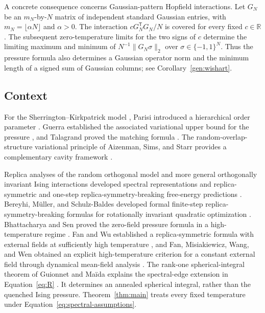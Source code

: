 \documentclass[11pt]{article}
\theoremstyle{definition}
\theoremstyle{remark}
\numberwithin{equation}{section}
\newcommand{\R}{\mathbb R}
\begin{document}
A concrete consequence concerns Gaussian-pattern Hopfield interactions.
Let $G_N$ be an $m_N$-by-$N$ matrix of independent standard Gaussian
entries, with $m_N=\lfloor\alpha N\rfloor$ and $\alpha>0$. The interaction
$cG_N^{\mathsf T}G_N/N$ is covered for every fixed $c\in\R$.
The subsequent zero-temperature limits for the two signs of $c$
determine the limiting maximum and minimum of
$N^{-1}\|G_N\sigma\|_2$ over $\sigma\in\{-1,1\}^N$.
Thus the pressure formula also determines a Gaussian operator norm and
the minimum length of a signed sum of Gaussian columns; see
Corollary~\ref{gen:wishart}.

\subsection{Context}

For the Sherrington--Kirkpatrick model \cite{SherringtonKirkpatrick},
Parisi introduced a hierarchical order parameter \cite{Parisi1979}.
Guerra established the associated variational upper bound for the pressure
\cite{Guerra2003}, and Talagrand proved the matching formula
\cite{Talagrand2006}. The random-overlap-structure variational principle
of Aizenman, Sims, and Starr provides a complementary cavity framework
\cite{ASS2003}.

Replica analyses of the random orthogonal model and more general
orthogonally invariant Ising interactions developed spectral
representations and replica-symmetric and one-step replica-symmetry-breaking
free-energy predictions \cite{MarinariParisiRitort,CherrierDeanLefevre}.
Bereyhi, M\"uller, and Schulz-Baldes developed formal finite-step
replica-symmetry-breaking formulas for rotationally invariant quadratic
optimization \cite[Equations~(114)--(115) and Appendix~D]{BereyhiMullerSchulzBaldes2016}.
Bhattacharya and Sen proved the zero-field pressure formula in a
high-temperature regime \cite[Theorem~1.2]{BhattacharyaSen}.
Fan and Wu established a replica-symmetric formula with external fields
at sufficiently high temperature
\cite[Theorem~1.3]{FanWu}, and Fan, Misiakiewicz, Wang, and Wen obtained
an explicit high-temperature criterion for a constant external field
through dynamical mean-field analysis \cite[Corollary~2.8]{Fan2026}.
The rank-one spherical-integral theorem of Guionnet and Ma\"ida explains
the spectral-edge extension in Equation~\eqref{eq:R}
\cite[Theorem~1.6 in the cited arXiv version]{GuionnetMaida}.
It determines an annealed spherical integral, rather than the quenched
Ising pressure. Theorem~\ref{thm:main} treats every fixed temperature
under Equation~\eqref{eq:spectral-assumptions}.
\end{document}

